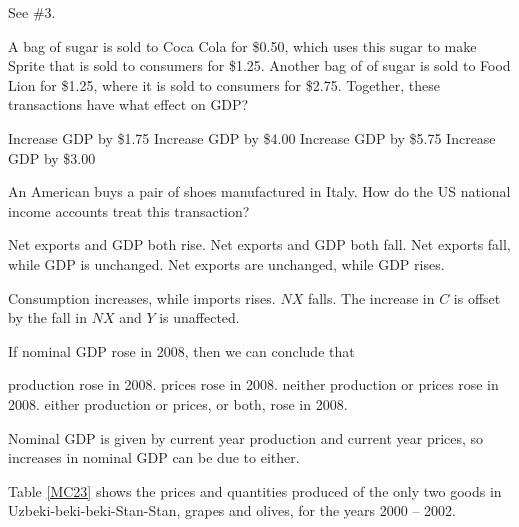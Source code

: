 \documentclass[addpoints,11pt]{exam}
\theoremstyle{definition}
\begin{document}
\begin{questions}
		\begin{solution}
			See \#3.
		\end{solution}
		
\question A bag of sugar is sold to Coca Cola for \$0.50, which uses this sugar to make Sprite that is sold to consumers for \$1.25. Another bag of of sugar is sold to Food Lion for \$1.25, where it is sold to consumers for \$2.75. Together, these transactions have what effect on GDP?


\begin{choices}
	\choice Increase GDP by \$1.75
	\CorrectChoice Increase GDP by \$4.00
	\choice Increase GDP by \$5.75
	\choice Increase GDP by \$3.00
\end{choices}
		
		\question An American buys a pair of shoes manufactured in Italy. How do the US national income accounts treat this transaction?
		
		\begin{choices}
			\choice Net exports and GDP both rise.
			\choice Net exports and GDP both fall.
			\CorrectChoice Net exports fall, while GDP is unchanged.
			\choice Net exports are unchanged, while GDP rises.
		\end{choices}
		
		\begin{solution}
			Consumption increases, while imports rises. $NX$ falls. The increase in $C$ is offset by the fall in $NX$ and $Y$ is unaffected.
		\end{solution}
		
		\question If nominal GDP rose in 2008, then we can conclude that 
		
		\begin{choices}
			\choice production rose in 2008.
			\choice prices rose in 2008.
			\choice neither production or prices rose in 2008.
			\CorrectChoice either production or prices, or both, rose in 2008.
		\end{choices}
		
		\begin{solution}
			Nominal GDP is given by current year production and current year prices, so increases in nominal GDP can be due to either.
		\end{solution}
		
\newpage
		
		\question Table \ref{MC23} shows the prices and quantities produced of the only two goods in Uzbeki-beki-beki-Stan-Stan, grapes and olives, for the years 2000 -- 2002.
		

\end{questions}
\end{document}
